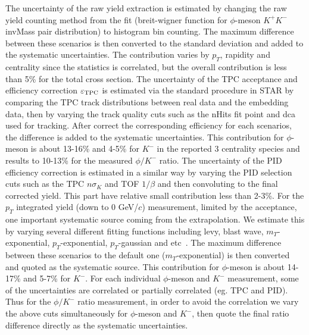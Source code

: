 \documentclass[%
 reprint,	
showpacs,
 amsmath,amssymb,
 aps,
 prc,
]{revtex4-1}
\begin{document}
The uncertainty of the raw yield extraction is estimated by changing the raw yield counting method from the fit (breit-wigner function for $\phi$-meson $K^+K^-$ invMass pair distribution) to histogram bin counting. The maximum difference between these scenarios is then converted to the standard deviation and added to the systematic uncertainties. The contribution varies by $p_T$, rapidity and centrality since the statistics is correlated, but the overall contribution is less than 5\% for the total cross section. The uncertainty of the TPC acceptance and efficiency correction $\varepsilon_{\rm TPC}$ is estimated via the standard procedure in STAR by comparing the TPC track distributions between real data and the embedding data, then by varying the track quality cuts such as the nHits fit point and dca used for tracking. After correct the corresponding efficiency for each scenarios, the difference is added to the systematic uncertainties. This contribution for $\phi$-meson is about 13-16\% and 4-5\% for $K^-$ in the reported 3 centrality species and results to 10-13\% for the measured $\phi/K^-$ ratio. The uncertainty of the PID efficiency correction is estimated in a similar way by varying the PID selection cuts such as the TPC $n\sigma_{K}$ and TOF $1/\beta$ and then convoluting to the final corrected yield. This part have relative small contribution less than 2-3\%. For the $p_T$ integrated yield (down to 0 GeV/$c$) measurement, limited by the acceptance, one important systematic source coming from the extrapolation. We estimate this by varying several different fitting functions including levy, blast wave, $m_T$-exponential, $p_T$-exponential, $p_T$-gaussian and etc~\cite{PhysRevC.79.034909}. The maximum difference between these scenarios to the default one ($m_T$-exponential) is then converted and quoted as the systematic source. This contribution for $\phi$-meson is about 14-17\% and 5-7\% for $K^-$. For each individual $\phi$-meson and $K^-$ measurement, some of the uncertainties are correlated or partially correlated (eg. TPC and PID). Thus for the $\phi/K^-$ ratio measurement, in order to avoid the correlation we vary the above cuts simultaneously for $\phi$-meson and $K^-$, then quote the final ratio difference directly as the systematic uncertainties.
\end{document}
